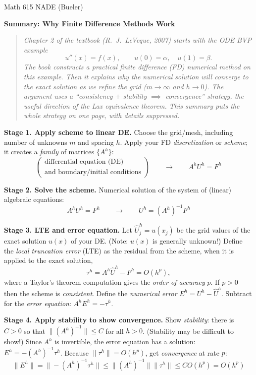 \documentclass[11pt]{amsart}
\newcommand{\prob}[1]{\bigskip\noindent\textbf{#1.}\quad }
\begin{document}
\scriptsize \noindent Math 615 NADE (Bueler) \hfill \quad {}
\normalsize\medskip

\Large\centerline{\textbf{Summary: Why Finite Difference Methods Work}}
\medskip
\normalsize

\thispagestyle{empty}
\begin{quote}
\emph{Chapter 2 of the textbook (R.~J.~LeVeque, 2007) starts with the ODE BVP example}
	$$u''(x)=f(x), \qquad u(0)=\alpha, \quad u(1) = \beta.$$
\emph{The book constructs a practical finite difference (FD) numerical method on this example.  Then it explains why the numerical solution will converge to the exact solution as we refine the grid ($m\to\infty$ and $h\to 0$).  The argument uses a ``consistency $+$ stability $\implies$ convergence'' strategy, the useful direction of the \emph{Lax equivalence theorem}.  This summary puts the whole strategy on one page, with details suppressed.}
\end{quote}

\medskip

\prob{Stage 1.  Apply scheme to linear DE}  Choose the grid/mesh, including number of unknowns $m$ and spacing $h$.  Apply your FD \emph{discretization} or \emph{scheme}; it creates a \emph{family} of matrices $\{A^h\}$:
   $$\begin{pmatrix} \text{differential equation (DE)} \\ \text{and boundary/initial conditions} \end{pmatrix} \qquad \to \qquad A^h U^h = F^h$$

\vfill
\prob{Stage 2.  Solve the scheme}  Numerical solution of the system of (linear) algebraic equations:
   $$A^h U^h = F^h \qquad \to \qquad U^h = (A^h)^{-1} F^h$$

\vfill
\prob{Stage 3.  LTE and error equation}  Let $\hat U^h_j = u(x_j)$ be the grid values of the exact solution $u(x)$ of your DE.  (Note: $u(x)$ is generally unknown!)  Define the \emph{local truncation error} (LTE) as the residual from the scheme, when it is applied to the exact solution,
   $$\tau^h = A^h \hat U^h - F^h = O(h^p),$$
where a Taylor's theorem computation gives the \emph{order of accuracy} $p$.  If $p>0$ then the scheme is \emph{consistent}.  Define the \emph{numerical error} $E^h = U^h - \hat U^h$.  Subtract for the \emph{error equation}: $A^h E^h = -\tau^h$.

\vfill
\prob{Stage 4.  Apply stability to show convergence}  Show \emph{stability}: there is $C>0$ so that $\|(A^h)^{-1}\| \le C$ for all $h>0$.  (Stability may be difficult to show!)  Since $A^h$ is invertible, the error equation has a solution: $E^h = - (A^h)^{-1} \tau^h$.  Because $\|\tau^h\| = O(h^p)$, get \emph{convergence} at rate $p$:
	$$\|E^h\| = \|- (A^h)^{-1} \tau^h\| \le \|(A^h)^{-1}\| \|\tau^h\| \le C O(h^p) = O(h^p)$$

\vfill
\end{document}
